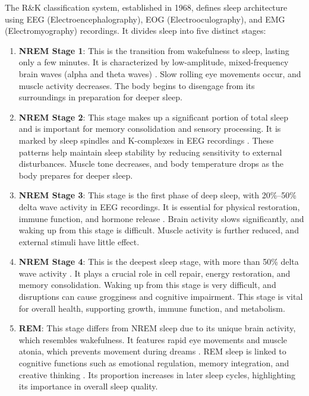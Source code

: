 The R\&K classification system, established in 1968, defines sleep architecture using \acs{EEG} (Electroencephalography), \acs{EOG} (Electrooculography), and \acs{EMG} (Electromyography) recordings. It divides sleep into five distinct stages:

\begin{enumerate}
    \item \textbf{NREM Stage 1}: This is the transition from wakefulness to sleep, lasting only a few minutes. It is characterized by low-amplitude, mixed-frequency brain waves (alpha and theta waves) \parencite{rechtschaffen1978techniques}. Slow rolling eye movements occur, and muscle activity decreases. The body begins to disengage from its surroundings in preparation for deeper sleep.

    \item \textbf{NREM Stage 2}: This stage makes up a significant portion of total sleep and is important for memory consolidation and sensory processing. It is marked by sleep spindles and K-complexes in \acs{EEG} recordings \parencite{de2003sleep}. These patterns help maintain sleep stability by reducing sensitivity to external disturbances. Muscle tone decreases, and body temperature drops as the body prepares for deeper sleep.

    \item \textbf{NREM Stage 3}: This stage is the first phase of deep sleep, with 20\%–50\% delta wave activity in \acs{EEG} recordings. It is essential for physical restoration, immune function, and hormone release \parencite{diekelmann2010memory}. Brain activity slows significantly, and waking up from this stage is difficult. Muscle activity is further reduced, and external stimuli have little effect.

    \item \textbf{NREM Stage 4}: This is the deepest sleep stage, with more than 50\% delta wave activity \parencite{diekelmann2010memory}. It plays a crucial role in cell repair, energy restoration, and memory consolidation. Waking up from this stage is very difficult, and disruptions can cause grogginess and cognitive impairment. This stage is vital for overall health, supporting growth, immune function, and metabolism.
    
    \item \textbf{REM}: This stage differs from \acs{NREM} sleep due to its unique brain activity, which resembles wakefulness. It features rapid eye movements and muscle atonia, which prevents movement during dreams \parencite{hobson2009rem}. \acs{REM} sleep is linked to cognitive functions such as emotional regulation, memory integration, and creative thinking \parencite{bjorn2013sleep}. Its proportion increases in later sleep cycles, highlighting its importance in overall sleep quality.
    
\end{enumerate}

